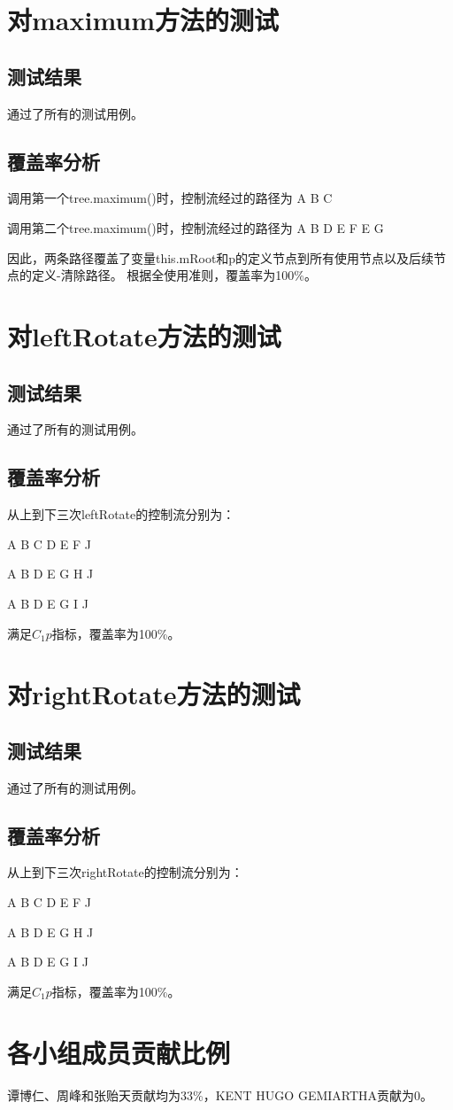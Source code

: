 \documentclass[12pt, a4paper, oneside]{ctexart}
\begin{document}
\section{对maximum方法的测试}

\subsection{测试结果}
通过了所有的测试用例。

\subsection{覆盖率分析}
调用第一个tree.maximum()时，控制流经过的路径为 A B C

调用第二个tree.maximum()时，控制流经过的路径为 A B D E F E G

因此，两条路径覆盖了变量this.mRoot和p的定义节点到所有使用节点以及后续节点的定义-清除路径。
根据全使用准则，覆盖率为100\%。

\section{对leftRotate方法的测试}

\subsection{测试结果}
通过了所有的测试用例。

\subsection{覆盖率分析}
从上到下三次leftRotate的控制流分别为：

A B C D E F J

A B D E G H J

A B D E G I J

满足$C_1p$指标，覆盖率为100\%。

\section{对rightRotate方法的测试}

\subsection{测试结果}
通过了所有的测试用例。

\subsection{覆盖率分析}
从上到下三次rightRotate的控制流分别为：

A B C D E F J

A B D E G H J

A B D E G I J

满足$C_1p$指标，覆盖率为100\%。

\section{各小组成员贡献比例}
谭博仁、周峰和张贻天贡献均为33\%，KENT HUGO GEMIARTHA贡献为0。
\end{document}
